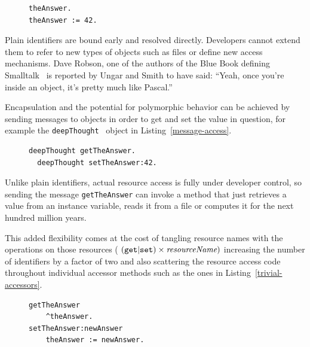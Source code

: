 \documentclass{acm_proc_article-sp}
\begin{document}
\begin{figure}[htbp]
\begin{lstlisting}[style=numbers,label=variable-lookup,caption=Retrieve and store value via plain identifier.]
theAnswer.
theAnswer := 42.
\end{lstlisting}
\end{figure}

Plain identifiers are bound early and resolved directly.  
Developers cannot extend them to refer to
new types of objects such as files or define new access mechanisms.  Dave Robson, one of the authors
of the Blue Book defining Smalltalk~\cite{Goldberg1983} is reported by Ungar and Smith to have said: ``Yeah, once you're inside an object, it's pretty much like Pascal.''~\cite{Ungar:2007:SEL:1238844.1238853}


Encapsulation and the potential for polymorphic behavior can be achieved by sending 
messages to objects in order to get and set the value in question, for example the
{\tt deepThought}~\cite{adams1997hitchhiker}  object in Listing~\ref{message-access}.  

\begin{figure}[htbp]
\begin{lstlisting}[style=numbers,label=message-access,caption=Retrieve and store value via message sends.]
  deepThought getTheAnswer.
  deepThought setTheAnswer:42.
\end{lstlisting}
\end{figure}

Unlike plain identifiers, actual resource access is fully under developer control, so sending the 
message {\tt getTheAnswer} can invoke a method that just retrieves a value from an instance
variable, reads it from a file or computes it for the next hundred million years.


This added flexibility comes at the cost of tangling resource names with the operations on those
resources (  $({\tt get}|{\tt set}) \times {\mbox{\em resourceName}} ) $ %
increasing the number of identifiers by a factor of two and also scattering the resource access code
throughout individual accessor methods such as the
ones in Listing~\ref{trivial-accessors}.  

\begin{figure}[htbp]
\begin{lstlisting}[style=numbers,label=trivial-accessors,caption=Trivial accessors.]
getTheAnswer
    ^theAnswer.
setTheAnswer:newAnswer
    theAnswer := newAnswer.
\end{lstlisting}
\end{figure}
\end{document}
